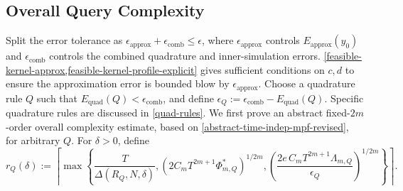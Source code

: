 \documentclass[10pt,reqno]{article}
\numberwithin{equation}{section}
\theoremstyle{plain}
\theoremstyle{definition}
\begin{document}
\subsection{Overall Query Complexity}\label{abs-rel}
Split the error tolerance as \(\epsilon_{\operatorname{approx}}+\epsilon_{\operatorname{comb}}\leq\epsilon\), where \(\epsilon_{\operatorname{approx}}\) controls \(E_{\operatorname{approx}}(y_0)\) and \(\epsilon_{\operatorname{comb}}\) controls the combined quadrature and inner-simulation errors.  \cref{feasible-kernel-approx,feasible-kernel-profile-explicit} gives sufficient conditions on $c,d$ to ensure the approximation error is bounded blow by $\epsilon_{\operatorname{approx}}$. Choose a  quadrature rule \(Q\) such that \(E_{\operatorname{quad}}(Q)<\epsilon_{\operatorname{comb}}\), and define \(\epsilon_Q:=\epsilon_{\operatorname{comb}}-E_{\operatorname{quad}}(Q)\). Specific quadrature rules are discussed in \cref{quad-rules}. We first prove an abstract fixed-\(2m\)-order overall complexity estimate, based on \cref{abstract-time-indep-mpf-revised}, for arbitrary \(Q\). For \(\delta>0\), define
\begin{equation}\label{abstract-rQ-delta-def}
r_Q(\delta) := \left\lceil \max\left\{ \frac{T}{\Delta(R_Q,N,\delta)}, \left(2C_mT^{2m+1}\Phi_{m,Q}^{\ast}\right)^{1/2m}, \left( \frac{2e\,C_mT^{2m+1}\Lambda_{m,Q}}{\epsilon_Q} \right)^{1/2m} \right\} \right\rceil .
\end{equation}
\end{document}
